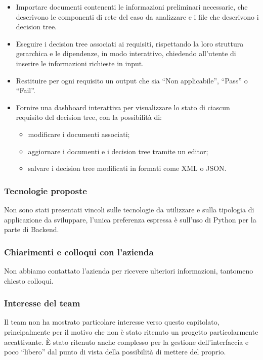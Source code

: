 \documentclass[a4paper,11pt]{article}
\begin{document}
\begin{itemize}[leftmargin=*]
    \item Importare documenti contenenti le informazioni preliminari necessarie, che descrivono le componenti di rete del caso da analizzare e i file che descrivono i decision tree.
    \item Eseguire i decision tree associati ai requisiti, rispettando la loro struttura gerarchica e le dipendenze, in modo interattivo, chiedendo all’utente di inserire le informazioni richieste in input.
    \item Restituire per ogni requisito un output che sia ``Non applicabile'', ``Pass'' o ``Fail''.
    \item Fornire una dashboard interattiva per visualizzare lo stato di ciascun requisito del decision tree, con la possibilità di:
    \begin{itemize}[leftmargin=*]
        \item modificare i documenti associati;  
        \item aggiornare i documenti e i decision tree tramite un editor;  
        \item salvare i decision tree modificati in formati come XML o JSON.
    \end{itemize}
\end{itemize}
\subsubsection{Tecnologie proposte}
Non sono stati presentati vincoli sulle tecnologie da utilizzare e sulla tipologia di applicazione da sviluppare, l'unica preferenza espressa è sull’uso di Python per la parte di Backend.
\subsubsection{Chiarimenti e colloqui con l'azienda}
Non abbiamo contattato l’azienda per ricevere ulteriori informazioni, tantomeno chiesto colloqui.
\subsubsection{Interesse del team}
Il team non ha mostrato particolare interesse verso questo capitolato, principalmente per il motivo che non è stato ritenuto un progetto particolarmente accattivante. È stato ritenuto anche complesso per la gestione dell’interfaccia e poco “libero” dal punto di vista della possibilità di mettere del proprio.
\end{document}
